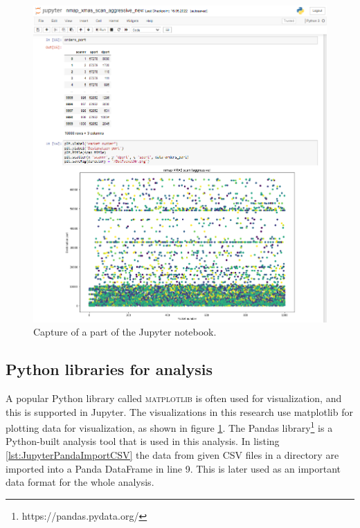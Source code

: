 \begin{figure}[!htbp]
\centerline{\includegraphics[scale=0.55]{images/analysis/JupyterScreenshot.PNG}}
\caption{Capture of a part of the Jupyter notebook.}
\label{fig:JupyterScreenshot}
\end{figure}


\subsection{Python libraries for analysis}
\label{s:AnalysisPythonLibrary}

A popular Python library called \textsc{matplotlib} is often used for visualization, and this is supported in Jupyter.
The visualizations in this research use matplotlib for plotting data for visualization, as shown in figure \ref{fig:JupyterScreenshot}.
The Pandas library\footnote{https://pandas.pydata.org/} is a Python-built analysis tool that is used in this analysis.
In listing \ref{lst:JupyterPandaImportCSV} the data from given CSV files in a directory are imported into a Panda DataFrame in line 9. This is later used as an important data format for the whole analysis.


